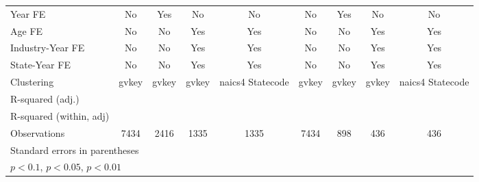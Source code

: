 {\begin{tabular}{l*{8}{c}}
\addlinespace
Year FE             &          No         &         Yes         &          No         &          No         &          No         &         Yes         &          No         &          No         \\
\addlinespace
Age FE              &          No         &          No         &         Yes         &         Yes         &          No         &          No         &         Yes         &         Yes         \\
\addlinespace
Industry-Year FE    &          No         &          No         &         Yes         &         Yes         &          No         &          No         &         Yes         &         Yes         \\
\addlinespace
State-Year FE       &          No         &          No         &         Yes         &         Yes         &          No         &          No         &         Yes         &         Yes         \\
\midrule
Clustering          &       gvkey         &       gvkey         &       gvkey         &naics4 Statecode         &       gvkey         &       gvkey         &       gvkey         &naics4 Statecode         \\
R-squared (adj.)    &                     &                     &                     &                     &                     &                     &                     &                     \\
R-squared (within, adj)&                     &                     &                     &                     &                     &                     &                     &                     \\
Observations        &        7434         &        2416         &        1335         &        1335         &        7434         &         898         &         436         &         436         \\
\bottomrule
\multicolumn{9}{l}{\footnotesize Standard errors in parentheses}\\
\multicolumn{9}{l}{\footnotesize \sym{*} \(p<0.1\), \sym{**} \(p<0.05\), \sym{***} \(p<0.01\)}\\
\end{tabular}
}
